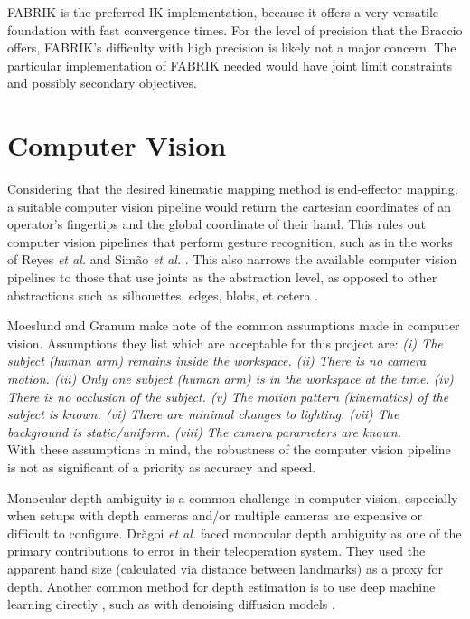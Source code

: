 FABRIK is the preferred IK implementation, because it offers a very versatile foundation with fast convergence times. For the level of precision that the Braccio offers, FABRIK's difficulty with high precision is likely not a major concern. The particular implementation of FABRIK needed would have joint limit constraints and possibly secondary objectives.

\section{Computer Vision}

Considering that the desired kinematic mapping method is end-effector mapping, a suitable computer vision pipeline would return the cartesian coordinates of an operator's fingertips and the global coordinate of their hand. This rules out computer vision pipelines that perform gesture recognition, such as in the works of Reyes \textit{et al.} \cite{bib:braccio_hand_gestures} and Simão \textit{et al.} \cite{bib:gesture_recognition}. This also narrows the available computer vision pipelines to those that use joints as the abstraction level, as opposed to other abstractions such as silhouettes, edges, blobs, et cetera \cite{bib:computer_vision_overview}.

Moeslund and Granum \cite{bib:computer_vision_overview} make note of the common assumptions made in computer vision. Assumptions they list which are acceptable for this project are: \textit{(i) The subject (human arm) remains inside the workspace. (ii) There is no camera motion. (iii) Only one subject (human arm) is in the workspace at the time. (iv) There is no occlusion of the subject. (v) The motion pattern (kinematics) of the subject is known. (vi) There are minimal changes to lighting. (vii) The background is static/uniform. (viii) The camera parameters are known.}\\
With these assumptions in mind, the robustness of the computer vision pipeline is not as significant of a priority as accuracy and speed.

Monocular depth ambiguity is a common challenge in computer vision, especially when setups with depth cameras and/or multiple cameras are expensive or difficult to configure. Drăgoi \textit{et al.} \cite{bib:teleoperation_intuitive_using_MediaPipeHands} faced monocular depth ambiguity as one of the primary contributions to error in their teleoperation system. They used the apparent hand size (calculated via distance between landmarks) as a proxy for depth. Another common method for depth estimation is to use deep machine learning directly \cite{bib:depth_ambiguity_survey}, such as with denoising diffusion models \cite{bib:denoising_diffusion_for_depth_ambiguity}.

